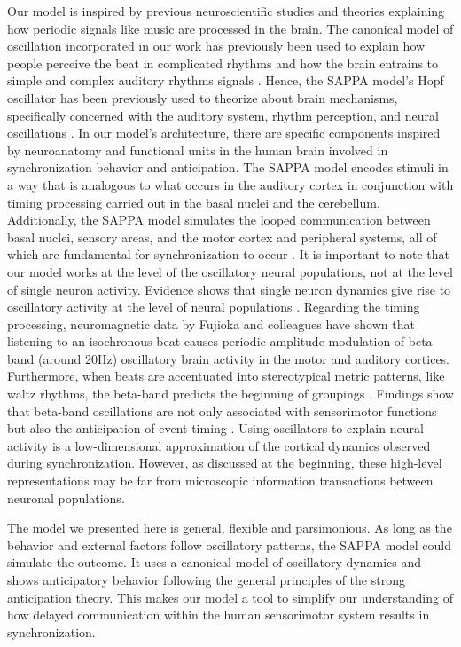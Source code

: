 \documentclass{report}
\begin{document}
Our model is inspired by previous neuroscientific studies and theories explaining how periodic signals like music are processed in the brain. The canonical model of oscillation incorporated in our work has previously been used to explain how people perceive the beat in complicated rhythms \cite{large2015neural} and how the brain entrains to simple and complex auditory rhythms signals \cite{large2015neural, tal2017neural}. Hence, the SAPPA model's Hopf oscillator has been previously used to theorize about brain mechanisms, specifically concerned with the auditory system, rhythm perception, and neural oscillations \cite{large2015neural, tal2017neural}. In our model's architecture, there are specific components inspired by neuroanatomy and functional units in the human brain involved in synchronization behavior and anticipation. The SAPPA model encodes stimuli in a way that is analogous to what occurs in the auditory cortex in conjunction with timing processing carried out in the basal nuclei and the cerebellum. Additionally, the SAPPA model simulates the looped communication between basal nuclei, sensory areas, and the motor cortex and peripheral systems, all of which are fundamental for synchronization to occur \cite{aschersleben1995synchronizing, prinz1992don}. It is important to note that our model works at the level of the oscillatory neural populations, not at the level of single neuron activity. Evidence shows that single neuron dynamics give rise to oscillatory activity at the level of neural populations \cite{byrne2017mean}. Regarding the timing processing, neuromagnetic data by Fujioka and colleagues \cite{fujioka2012internalized} have shown that listening to an isochronous beat causes periodic amplitude modulation of beta-band (around 20Hz) oscillatory brain activity in the motor and auditory cortices. Furthermore, when beats are accentuated into stereotypical metric patterns, like waltz rhythms, the beta-band predicts the beginning of groupings \cite{fujioka2015beta}. Findings show that beta-band oscillations are not only associated with sensorimotor functions \cite{pfurtscheller1981central, salmelin1995functional} but also the anticipation of event timing \cite{arnal2015delta, breska2016synchronizing}. Using oscillators to explain neural activity is a low-dimensional approximation of the cortical dynamics observed during synchronization. However, as discussed at the beginning, these high-level representations may be far from microscopic information transactions between neuronal populations.

The model we presented here is general, flexible and parsimonious. As long as the behavior and external factors follow oscillatory patterns, the SAPPA model could simulate the outcome. It uses a canonical model of oscillatory dynamics and shows anticipatory behavior following the general principles of the strong anticipation theory. This makes our model a tool to simplify our understanding of how delayed communication within the human sensorimotor system results in synchronization.
\end{document}
